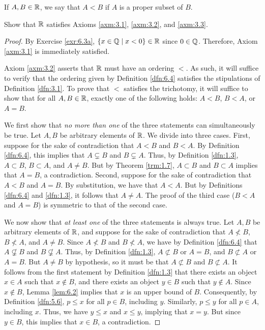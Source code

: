 \documentclass[../main.tex]{subfiles}
\begin{document}
\begin{definition}\label{dfn:6.4}
    If $A,B\in\mathbb{R}$, we say that $A<B$ if $A$ is a proper subset of $B$.
\end{definition}

\begin{exercise}\label{exr:6.5}
    Show that $\mathbb{R}$ satisfies Axioms \ref{axm:3.1}, \ref{axm:3.2}, and \ref{axm:3.3}.
    \begin{proof}
        By Exercise \ref{exr:6.3a}, $\{x\in\mathbb{Q}\mid x<0\}\in\mathbb{R}$ since $0\in\mathbb{Q}$. Therefore, Axiom \ref{axm:3.1} is immediately satisfied.\par\medskip
        Axiom \ref{axm:3.2} asserts that $\mathbb{R}$ must have an ordering $<$. As such, it will suffice to verify that the ordering given by Definition \ref{dfn:6.4} satisfies the stipulations of Definition \ref{dfn:3.1}. To prove that $<$ satisfies the trichotomy, it will suffice to show that for all $A,B\in\mathbb{R}$, exactly one of the following holds: $A<B$, $B<A$, or $A=B$.\par
        We first show that \emph{no more than one} of the three statements can simultaneously be true. Let $A,B$ be arbitrary elements of $\mathbb{R}$. We divide into three cases. First, suppose for the sake of contradiction that $A<B$ and $B<A$. By Definition \ref{dfn:6.4}, this implies that $A\subsetneq B$ and $B\subsetneq A$. Thus, by Definition \ref{dfn:1.3}, $A\subset B$, $B\subset A$, and $A\neq B$. But by Theorem \ref{trm:1.7}, $A\subset B$ and $B\subset A$ implies that $A=B$, a contradiction. Second, suppose for the sake of contradiction that $A<B$ and $A=B$. By substitution, we have that $A<A$. But by Definitions \ref{dfn:6.4} and \ref{dfn:1.3}, it follows that $A\neq A$. The proof of the third case ($B<A$ and $A=B$) is symmetric to that of the second case.\par
        We now show that \emph{at least one} of the three statements is always true. Let $A,B$ be arbitrary elements of $\mathbb{R}$, and suppose for the sake of contradiction that $A\not<B$, $B\not<A$, and $A\neq B$. Since $A\not<B$ and $B\not<A$, we have by Definition \ref{dfn:6.4} that $A\not\subsetneq B$ and $B\not\subsetneq A$. Thus, by Definition \ref{dfn:1.3}, $A\not\subset B$ or $A=B$, and $B\not\subset A$ or $A=B$. But $A\neq B$ by hypothesis, so it must be that $A\not\subset B$ and $B\not\subset A$. It follows from the first statement by Definition \ref{dfn:1.3} that there exists an object $x\in A$ such that $x\notin B$, and there exists an object $y\in B$ such that $y\notin A$. Since $x\notin B$, Lemma \ref{lem:6.2} implies that $x$ is an upper bound of $B$. Consequently, by Definition \ref{dfn:5.6}, $p\leq x$ for all $p\in B$, including $y$. Similarly, $p\leq y$ for all $p\in A$, including $x$. Thus, we have $y\leq x$ and $x\leq y$, implying that $x=y$. But since $y\in B$, this implies that $x\in B$, a contradiction.\par\smallskip

\end{proof}
\end{exercise}
\end{document}
